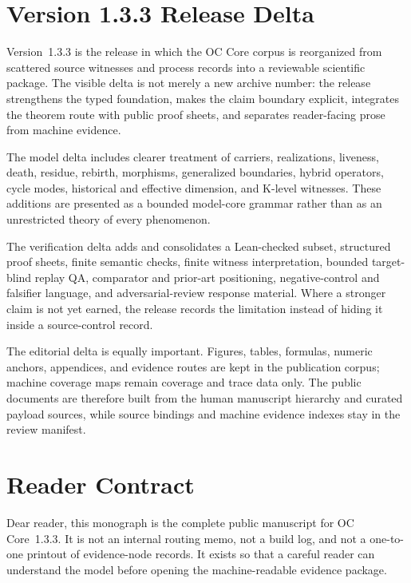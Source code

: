 \clearpage
\section*{Version 1.3.3 Release Delta}
Version~1.3.3 is the release in which the OC Core corpus is reorganized from
scattered source witnesses and process records into a reviewable scientific
package. The visible delta is not merely a new archive number: the release
strengthens the typed foundation, makes the claim boundary explicit, integrates
the theorem route with public proof sheets, and separates reader-facing prose
from machine evidence.

The model delta includes clearer treatment of carriers, realizations, liveness,
death, residue, rebirth, morphisms, generalized boundaries, hybrid operators,
cycle modes, historical and effective dimension, and K-level witnesses. These
additions are presented as a bounded model-core grammar rather than as an
unrestricted theory of every phenomenon.

The verification delta adds and consolidates a Lean-checked subset, structured
proof sheets, finite semantic checks, finite witness interpretation, bounded
target-blind replay QA, comparator and prior-art positioning, negative-control
and falsifier language, and adversarial-review response material. Where a
stronger claim is not yet earned, the release records the limitation instead of
hiding it inside a source-control record.

The editorial delta is equally important. Figures, tables, formulas, numeric
anchors, appendices, and evidence routes are kept in the publication corpus;
machine coverage maps remain coverage and trace data only. The public
documents are therefore built from the human manuscript hierarchy and curated
payload sources, while source bindings and machine evidence indexes stay in the
review manifest.

\clearpage
\section*{Reader Contract}
Dear reader, this monograph is the complete public manuscript for OC
Core~1.3.3. It is not an internal routing memo, not a build log, and not a
one-to-one printout of evidence-node records. It exists so that a careful
reader can understand the model before opening the machine-readable evidence
package.

